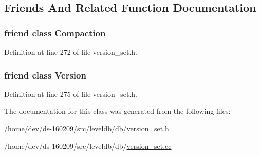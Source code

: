 \subsection{Friends And Related Function Documentation}
\hypertarget{classleveldb_1_1_version_set_a9372e882b35d27c78356228e4b758917}{}
\subsubsection[{Compaction}]{\setlength{\rightskip}{0pt plus 5cm}friend class {\bf Compaction}\hspace{0.3cm}{\ttfamily [friend]}}\label{classleveldb_1_1_version_set_a9372e882b35d27c78356228e4b758917}


Definition at line 272 of file version\+\_\+set.\+h.

\hypertarget{classleveldb_1_1_version_set_ace162f32d4abb584945d3a55a389b0a3}{}
\subsubsection[{Version}]{\setlength{\rightskip}{0pt plus 5cm}friend class {\bf Version}\hspace{0.3cm}{\ttfamily [friend]}}\label{classleveldb_1_1_version_set_ace162f32d4abb584945d3a55a389b0a3}


Definition at line 275 of file version\+\_\+set.\+h.



The documentation for this class was generated from the following files\+:\begin{DoxyCompactItemize}
\item 
/home/dev/ds-\/160209/src/leveldb/db/\hyperlink{version__set_8h}{version\+\_\+set.\+h}\item 
/home/dev/ds-\/160209/src/leveldb/db/\hyperlink{version__set_8cc}{version\+\_\+set.\+cc}\end{DoxyCompactItemize}
